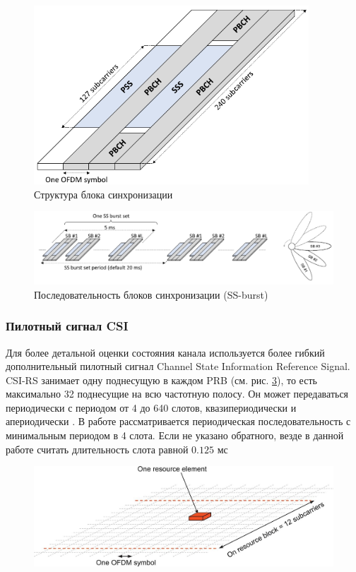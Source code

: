 \begin{figure}[h!]
    \centering
    \includegraphics[width=0.4\linewidth]{figs/fig4.1}
    \caption{Структура блока синхронизации}
    \label{fig:4.1}
\end{figure}
\begin{figure}[h!]
    \centering
    \includegraphics[width=\linewidth]{figs/fig4.2}
    \caption{Последовательность блоков синхронизации (SS-burst)}
    \label{fig:4.2}
\end{figure}


\subsubsection{Пилотный сигнал CSI}
Для более детальной оценки состояния канала используется более гибкий
дополнительный пилотный сигнал Channel State Information Reference Signal.
CSI-RS занимает одну поднесущую в каждом PRB (см. рис. \ref{fig:4.2a}), то есть
максимально 32 поднесущие на всю частотную полосу. 
Он может передаваться периодически
с периодом от 4 до 640 слотов, квазипериодически и
апериодически \cite{Dahlman2018}. 
В работе рассматривается периодическая последовательность с минимальным периодом
в 4 слота.  Если не указано обратного, везде в данной работе считать
длительность слота равной $0.125$ мс

\begin{figure}[h!]
    \centering
    \includegraphics[width=0.5\linewidth]{figs/fig4.2a}
    \caption{}
    \label{fig:4.2a}
\end{figure}


